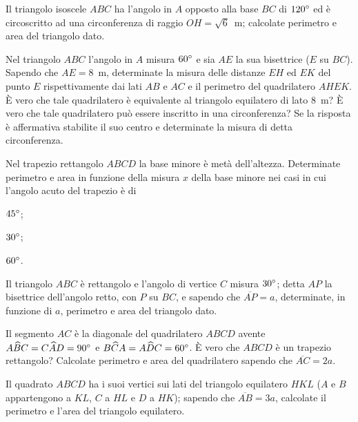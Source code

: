 \begin{multicols}{2}
\begin{esercizio}
\label{ese:7.30}
Il triangolo isoscele $ABC$ ha l'angolo in $A$ opposto alla base $BC$ di $120{}^{\circ}$ ed è circoscritto ad una circonferenza di raggio $OH=\sqrt{6}$~m; calcolate perimetro e area del triangolo dato.
\end{esercizio}

\begin{esercizio}
\label{ese:7.31}
Nel triangolo $ABC$ l'angolo in $A$ misura $60{}^{\circ}$ e sia $AE$ la sua bisettrice ($E$ su $BC$). Sapendo che $AE=8$~m, determinate la misura delle distanze $EH$ ed $EK$ del punto $E$ rispettivamente dai lati $AB$ e $AC$ e il perimetro del quadrilatero $AHEK$. \`E vero che tale quadrilatero è equivalente al triangolo equilatero di lato 8~m? \`E vero che tale quadrilatero può essere inscritto in una circonferenza? Se la risposta è affermativa stabilite il suo centro e determinate la misura di detta circonferenza.
\end{esercizio}

\begin{esercizio}
\label{ese:7.32}
Nel trapezio rettangolo $ABCD$ la base minore è metà dell'altezza. Determinate perimetro e area in funzione della misura $x$ della base minore nei casi in cui l'angolo acuto del trapezio è di
\begin{enumeratea}
\item $45{}^{\circ}$;
\item $30{}^{\circ}$;
\item $60{}^{\circ}$.
\end{enumeratea}
\end{esercizio}

\begin{esercizio}
\label{ese:7.33}
Il triangolo $ABC$ è rettangolo e l'angolo di vertice $C$ misura $30{}^{\circ}$; detta $AP$ la bisettrice dell'angolo retto, con $P$ su $BC$, e sapendo che $\overline{AP}=a$, determinate, in funzione di $a$, perimetro e area del triangolo dato.
\end{esercizio}

\begin{esercizio}
\label{ese:7.34}
Il segmento $AC$ è la diagonale del quadrilatero $ABCD$ avente $A\widehat{B}C=C\widehat{A}D=90{}^{\circ}$ e $B\widehat{C}A=A\widehat{D}C=60{}^{\circ}$. \`E vero che $ABCD$ è un trapezio rettangolo? Calcolate perimetro e area del quadrilatero sapendo che $\overline{AC}=2a$.
\end{esercizio}

\begin{esercizio}
\label{ese:7.35}
Il quadrato $ABCD$ ha i suoi vertici sui lati del triangolo equilatero $HKL$ ($A$ e $B$ appartengono a $KL$, $C$ a $HL$ e $D$ a $HK$); sapendo che $\overline{AB}=3a$, calcolate il perimetro e l'area del triangolo equilatero.
\end{esercizio}


\end{multicols}
